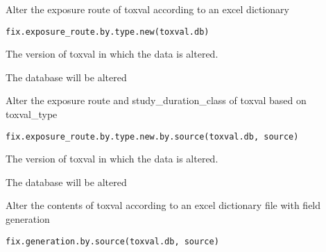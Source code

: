 \documentclass[letterpaper]{book}
\begin{document}
%
\begin{Description}\relax
Alter the exposure route of toxval according to an excel dictionary
\end{Description}
%
\begin{Usage}
\begin{verbatim}
fix.exposure_route.by.type.new(toxval.db)
\end{verbatim}
\end{Usage}
%
\begin{Arguments}
\begin{ldescription}
\item[\code{toxval.db}] The version of toxval in which the data is altered.
\end{ldescription}
\end{Arguments}
%
\begin{Value}
The database will be altered
\end{Value}
%
\begin{Description}\relax
Alter the exposure route and study\_duration\_class of toxval based on toxval\_type
\end{Description}
%
\begin{Usage}
\begin{verbatim}
fix.exposure_route.by.type.new.by.source(toxval.db, source)
\end{verbatim}
\end{Usage}
%
\begin{Arguments}
\begin{ldescription}
\item[\code{toxval.db}] The version of toxval in which the data is altered.
\end{ldescription}
\end{Arguments}
%
\begin{Value}
The database will be altered
\end{Value}
%
\begin{Description}\relax
Alter the contents of toxval according to an excel dictionary file with field generation
\end{Description}
%
\begin{Usage}
\begin{verbatim}
fix.generation.by.source(toxval.db, source)
\end{verbatim}
\end{Usage}
\end{document}
